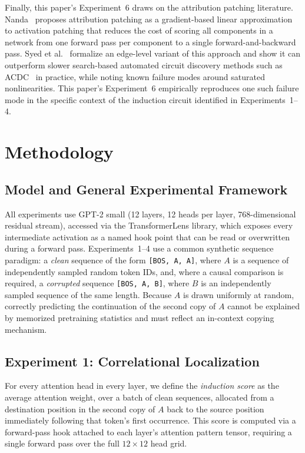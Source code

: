 \documentclass[conference]{IEEEtran}
\begin{document}
Finally, this paper's Experiment~6 draws on the attribution patching literature. Nanda~\cite{nanda2023attrpatch} proposes attribution patching as a gradient-based linear approximation to activation patching that reduces the cost of scoring all components in a network from one forward pass per component to a single forward-and-backward pass. Syed et al.~\cite{syed2023} formalize an edge-level variant of this approach and show it can outperform slower search-based automated circuit discovery methods such as ACDC~\cite{conmy2023} in practice, while noting known failure modes around saturated nonlinearities. This paper's Experiment~6 empirically reproduces one such failure mode in the specific context of the induction circuit identified in Experiments~1--4.

\section{Methodology}
\label{sec:method}

\subsection{Model and General Experimental Framework}

All experiments use GPT-2 small (12 layers, 12 heads per layer, 768-dimensional residual stream), accessed via the TransformerLens library, which exposes every intermediate activation as a named hook point that can be read or overwritten during a forward pass. Experiments~1--4 use a common synthetic sequence paradigm: a \emph{clean} sequence of the form \texttt{[BOS, A, A]}, where $A$ is a sequence of independently sampled random token IDs, and, where a causal comparison is required, a \emph{corrupted} sequence \texttt{[BOS, A, B]}, where $B$ is an independently sampled sequence of the same length. Because $A$ is drawn uniformly at random, correctly predicting the continuation of the second copy of $A$ cannot be explained by memorized pretraining statistics and must reflect an in-context copying mechanism.

\subsection{Experiment 1: Correlational Localization}

For every attention head in every layer, we define the \emph{induction score} as the average attention weight, over a batch of clean sequences, allocated from a destination position in the second copy of $A$ back to the source position immediately following that token's first occurrence. This score is computed via a forward-pass hook attached to each layer's attention pattern tensor, requiring a single forward pass over the full $12\times12$ head grid.
\end{document}
